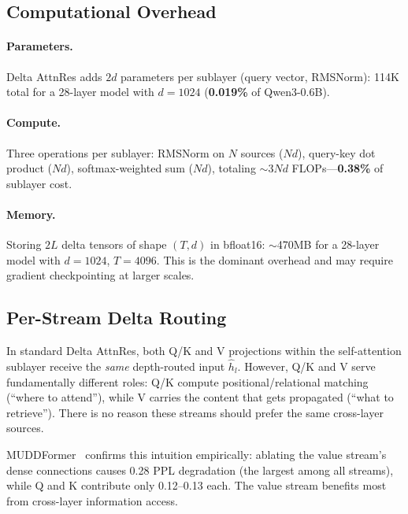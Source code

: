 \documentclass{article}
\begin{document}
\subsection{Computational Overhead}

\paragraph{Parameters.} Delta AttnRes adds $2d$ parameters per sublayer (query vector, RMSNorm): 114K total for a 28-layer model with $d=1024$ (\textbf{0.019\%} of Qwen3-0.6B).

\paragraph{Compute.} Three operations per sublayer: RMSNorm on $N$ sources ($Nd$), query-key dot product ($Nd$), softmax-weighted sum ($Nd$), totaling $\sim$3$Nd$ FLOPs---\textbf{0.38\%} of sublayer cost.

\paragraph{Memory.} Storing $2L$ delta tensors of shape $(T, d)$ in bfloat16: $\sim$470MB for a 28-layer model with $d{=}1024$, $T{=}4096$. This is the dominant overhead and may require gradient checkpointing at larger scales.

\subsection{Per-Stream Delta Routing}
\label{sec:per_stream}

In standard Delta AttnRes, both Q/K and V projections within the self-attention sublayer receive the \emph{same} depth-routed input $\hat{h}_l$. However, Q/K and V serve fundamentally different roles: Q/K compute positional/relational matching (``where to attend''), while V carries the content that gets propagated (``what to retrieve''). There is no reason these streams should prefer the same cross-layer sources.

MUDDFormer~\citep{wang2024muddformer} confirms this intuition empirically: ablating the value stream's dense connections causes 0.28 PPL degradation (the largest among all streams), while Q and K contribute only 0.12--0.13 each. The value stream benefits most from cross-layer information access.
\end{document}

